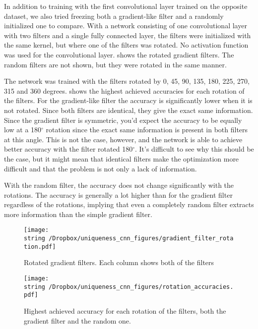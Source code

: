 In addition to training with the first convolutional layer trained on the opposite dataset, we also tried freezing  both a gradient-like filter and a randomly initialized one to compare.
With a network consisting of one convolutional layer with two filters and a single fully connected layer, the filters were initialized with the same kernel, but where one of the filters was rotated.
No activation function was used for the convolutional layer.
 shows the rotated gradient filters.
The random filters are not shown, but they were rotated in the same manner.

The network was trained with the filters rotated by 0, 45, 90, 135, 180, 225, 270, 315 and 360 degrees.
 shows the highest achieved accuracies for each rotation of the filters. For the gradient-like filter the accuracy is significantly lower when it is not rotated. Since both filters are identical, they give the exact same information. Since the gradient filter is symmetric, you'd expect the accuracy to be equally low at a 180$^\circ$ rotation since the exact same information is present in both filters at this angle. This is not the case, however, and the network is able to achieve better accuracy with the filter rotated 180$^\circ$. It's difficult to see why this should be the case, but it might mean that identical filters make the optimization more difficult and that the problem is not only a lack of information.

With the random filter, the accuracy does not change significantly with the rotations. The accuracy is generally a lot higher than for the gradient filter regardless of the rotations, implying that even a completely random filter extracts more information than the simple gradient filter.

\begin{figure}
  \begin{center}
    \texttt{[image: \\string~/Dropbox/uniqueness\_cnn\_figures/gradient\_filter\_rotation.pdf]}
  \end{center}
  \caption{Rotated gradient filters. Each column shows both of the filters }
  \label{fig:rotated_gradient_filter}
\end{figure}

\begin{figure}
  \begin{center}
    \texttt{[image: \\string~/Dropbox/uniqueness\_cnn\_figures/rotation\_accuracies.pdf]}
  \end{center}
  \vspace{5mm}
  \caption{Highest achieved accuracy for each rotation of the filters, both the gradient filter and the random one.}
  \label{fig:rotated_filter_accuracies}
\end{figure}


